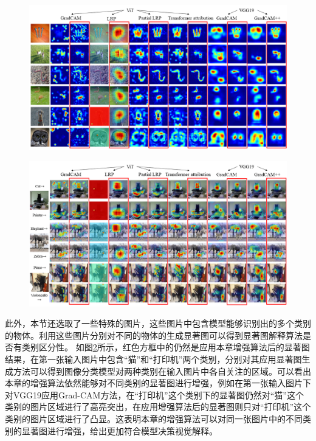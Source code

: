\begin{figure}[H]
	\centering 
	\includegraphics[width=15cm]{fig/ch4/Contrast1.png}
	\label{fig:contrast2}
\end{figure}

\begin{figure}[h]
	\centering 
	\includegraphics[width=15cm]{fig/ch4/classSensitive.png}
	\label{fig:classSensitive}
\end{figure}

此外，本节还选取了一些特殊的图片，这些图片中包含模型能够识别出的多个类别的物体。利用这些图片分别对不同的物体的生成显著图可以得到显著图解释算法是否有类别区分性。 如图\ref{fig:classSensitive}所示，红色方框中的仍然是应用本章增强算法后的显著图结果，在第一张输入图片中包含“猫”和“打印机”两个类别，分别对其应用显著图生成方法可以得到图像分类模型对两种类别在输入图片中各自关注的区域。可以看出本章的增强算法依然能够对不同类别的显著图进行增强，例如在第一张输入图片下对VGG19应用Grad-CAM方法，在“打印机”这个类别下的显著图仍然对“猫”这个类别的图片区域进行了高亮突出，在应用增强算法后的显著图则只对“打印机”这个类别的图片区域进行了凸显。这表明本章的增强算法可以对同一张图片中的不同类别的显著图进行增强，给出更加符合模型决策视觉解释。


